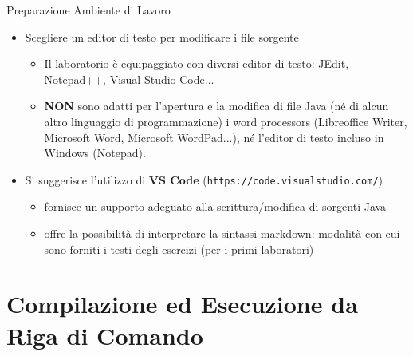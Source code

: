 \documentclass[xcolor=dvipsnames,presentation]{beamer}
\begin{document}
\begin{frame}{Preparazione Ambiente di Lavoro}
    \begin{itemize}
        \item Scegliere un editor di testo per modificare i file sorgente
        \begin{itemize}
            \item Il laboratorio è equipaggiato con diversi editor di testo: JEdit, Notepad++, Visual Studio Code...
            \item \textbf{NON} sono adatti per l'apertura e la modifica di file Java
            (né di alcun altro linguaggio di programmazione) i word processors (Libreoffice Writer, Microsoft Word, Microsoft WordPad...), né l'editor di testo incluso in Windows (Notepad).
        \end{itemize}
        \item Si suggerisce l'utilizzo di \textbf{VS Code} (\texttt{https://code.visualstudio.com/})
        \begin{itemize}
            \item fornisce un supporto adeguato alla scrittura/modifica di sorgenti Java
            \item offre la possibilità di interpretare la sintassi markdown: modalità con cui sono forniti i testi degli esercizi (per i primi laboratori)
        \end{itemize}
    \end{itemize}
\end{frame}

\section{Compilazione ed Esecuzione da Riga di Comando}

\end{document}
